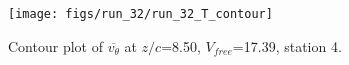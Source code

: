 \begin{figure}[H]
\centering
\texttt{[image: figs/run\_32/run\_32\_T\_contour]}
\caption{Contour plot of $\overline{v_{\theta}}$ at $z/c$=8.50, $V_{free}$=17.39, station 4.}
\label{fig:run_32_T_contour}
\end{figure}


